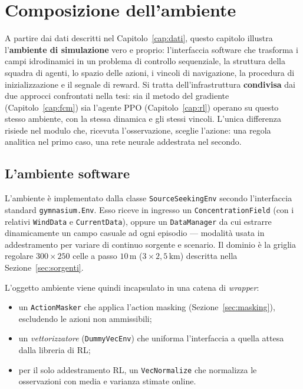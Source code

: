 \chapter{Composizione dell'ambiente}
\label{cap:ambiente}

A partire dai dati descritti nel Capitolo~\ref{cap:dati}, questo capitolo illustra
l'\textbf{ambiente di simulazione} vero e proprio: l'interfaccia software che trasforma i
campi idrodinamici in un problema di controllo sequenziale, la struttura della squadra di
agenti, lo spazio delle azioni, i vincoli di navigazione, la procedura di inizializzazione
e il segnale di reward. Si tratta dell'infrastruttura \textbf{condivisa} dai due approcci
confrontati nella tesi: sia il metodo del gradiente (Capitolo~\ref{cap:fcm}) sia l'agente
PPO (Capitolo~\ref{cap:rl}) operano su questo stesso ambiente, con la stessa dinamica e
gli stessi vincoli. L'unica differenza risiede nel modulo che, ricevuta l'osservazione,
sceglie l'azione: una regola analitica nel primo caso, una rete neurale addestrata nel
secondo.

\section{L'ambiente software}
\label{sec:env}

L'ambiente \`e implementato dalla classe \texttt{SourceSeekingEnv} secondo l'interfaccia
standard \texttt{gymnasium.Env}. Esso riceve in ingresso un \texttt{ConcentrationField}
(con i relativi \texttt{WindData} e \texttt{CurrentData}), oppure un \texttt{DataManager}
da cui estrarre dinamicamente un campo casuale ad ogni episodio --- modalit\`a usata in
addestramento per variare di continuo sorgente e scenario. Il dominio \`e la griglia
regolare $300 \times 250$ celle a passo $10\,\text{m}$ ($3 \times 2{,}5\,\text{km}$)
descritta nella Sezione~\ref{sec:sorgenti}.

L'oggetto ambiente viene quindi incapsulato in una catena di \emph{wrapper}:
\begin{itemize}
    \item un \texttt{ActionMasker} che applica l'action masking
          (Sezione~\ref{sec:masking}), escludendo le azioni non ammissibili;
    \item un \emph{vettorizzatore} (\texttt{DummyVecEnv}) che uniforma l'interfaccia a
          quella attesa dalla libreria di RL;
    \item per il solo addestramento RL, un \texttt{VecNormalize} che normalizza le
          osservazioni con media e varianza stimate online.
\end{itemize}

